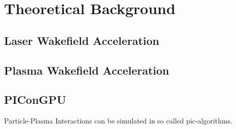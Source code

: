 \documentclass[bachelor_thesis]{subfiles}
\begin{document}
\chapter{Theoretical Background}
\section{Laser Wakefield Acceleration}
\section{Plasma Wakefield Acceleration}

\section{PIConGPU}
Particle-Plasma Interactions can be simulated in so called \gls{pic}-algorithms. 
\end{document}
